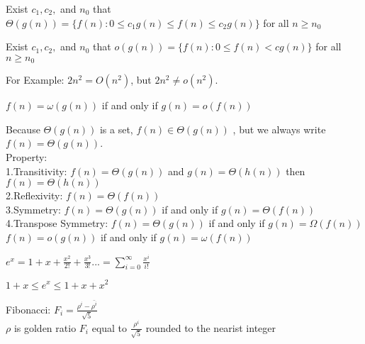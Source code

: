 \documentclass{article}
\begin{document}
\fontsize{12pt}{20pt}\selectfont
Exist $c_{1}, c_{2},$ and $n_{0}$ that
 $ \Theta(g(n)) = \{f(n): 0 \leq c_{1}g(n) \leq f(n) \leq c_{2}g(n)\}$
  for all $n \geq n_{0} $
  
  
Exist $c_{1}, c_{2},$ and $n_{0}$ that
 $ o(g(n)) = \{f(n): 0 \leq f(n) < cg(n)\}$
  for all $n \geq n_{0} $
  
  
For Example: $2n^{2} = O(n^{2})$, but $2n^{2} \neq o(n^{2})$.


$f(n) = \omega(g(n))$ if and only if $g(n) = o(f(n))$

Because $\Theta(g(n))$ is a set, $ f(n) \in \Theta(g(n))$ , but we always write $f(n) = \Theta(g(n))$.
\\Property:
\\ \indent 1.Transitivity: $f(n) = \Theta(g(n))$ and $g(n) = \Theta(h(n))$
then $f(n) = \Theta(h(n))$
\\ \indent 2.Reflexivity: $f(n) = \Theta(f(n))$
\\ \indent 3.Symmetry: $f(n) = \Theta(g(n))$ if and only if $g(n) = \Theta(f(n))$
\\ \indent 4.Transpose Symmetry: $f(n) = \Theta(g(n))$ if and only if $g(n) = \Omega(f(n))$
\\ $f(n) = o(g(n))$ if and only if $g(n) = \omega(f(n))$

$e^{x}= 1+x+\frac{x^{2}}{2!}+\frac{x^{3}}{3!} ... = \sum_{i=0}^{\infty}\frac{x^{i}}{i!}$

$1+x \leq e^{x} \leq 1+x+x^{2}$

Fibonacci: $F_{i} = \frac{\rho^{i} - \bar{\rho^{i}}}{\sqrt{5}}$
\\$\rho$ is golden ratio
$F_{i}$ equal to $\frac{\rho^{i}}{\sqrt{5}}$ rounded to the nearist integer
\end{document}
